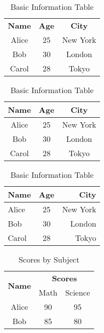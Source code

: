 \documentclass{article}
\begin{document}
\begin{table}[h]
\centering
\begin{tabular}{ccc}
\textbf{Name} & \textbf{Age} & \textbf{City} \\
Alice & 25 & New York \\
Bob   & 30 & London \\
Carol & 28 & Tokyo \\

\end{tabular}
\caption{Basic Information Table}
\label{tab:1}
\end{table}


\begin{table}[h]
\centering
\begin{tabular}{|c|c|c|}
\hline
\textbf{Name} & \textbf{Age} & \textbf{City} \\
\hline
Alice & 25 & New York \\ \hline
Bob   & 30 & London \\
Carol & 28 & Tokyo \\
\hline
\end{tabular}
\caption{Basic Information Table}
\label{tab:basicinfo}
\end{table}


\begin{table}[h]
\centering
\begin{tabular}{|l|c|r|}
\hline
\textbf{Name} & \textbf{Age} & \textbf{City} \\
\hline
Alice & 25 & New York \\ \hline
Bob   & 30 & London \\
Carol & 28 & Tokyo \\
\hline
\end{tabular}
\caption{Basic Information Table}
\label{tab:3}
\end{table}

\begin{table}[h]
\centering
\begin{tabular}{|c|c|c|}
\hline
\multirow{2}{*}{\textbf{Name}} & \multicolumn{2}{c|}{\textbf{Scores}} \\
\cline{2-3}
 & Math & Science \\
\hline
Alice & 90 & 95 \\
Bob   & 85 & 80 \\
\hline
\end{tabular}
\caption{Scores by Subject}
\end{table}
\end{document}
